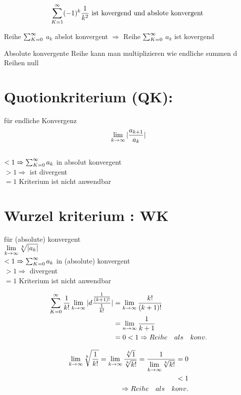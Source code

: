 \begin{example}
\[ \sum_{K=1}^{\infty} (-1)^k \frac{1}{k^2}  \text{ ist kovergend und abslote konvergent } \]
\end{example}

\begin{theorem}
Reihe $\sum_{K=0}^{\infty}$ $a_k$ abslot konvergent $\Rightarrow$ Reihe $\sum_{K=0}^{\infty}$ $a_k$ ist kovergend	
\end{theorem}

\begin{remark}	
Absolute konvergente Reihe kann man multiplizieren wie endliche summen d Reihen null
\end{remark}

\section{Quotionkriterium (QK):}
für endliche Konvergenz\\
\[\lim\limits_{k \rightarrow \infty} |\frac{a_{k+1}}{a_k}|\] \\$< 1 \Rightarrow \sum_{K=0}^{\infty} a_k $ in absolut konvergent \\
$>1 \Rightarrow $ ist divergent\\
$=1 $ Kriterium ist nicht anwendbar 
\section{Wurzel kriterium : WK }
für (absolute) konvergent 
\\ $\lim\limits_{k \rightarrow \infty} \sqrt[k]{|a_k|}$\\
$<1 \Rightarrow \sum_{K=0}^{\infty} a_k$ in (absolute) konvergent\\
$>1 \Rightarrow$ divergent\\
$=1 $ Kriterium ist nicht anwendbar

\begin{example}[QK]
	 \begin{equation*}
		 \begin{split}
	    	\sum_{K=0}^{\infty} \dfrac{1}{k!}
	 	   \lim\limits_{k \rightarrow \infty} {|d\frac{\frac{1}{(k+1)!}}{\frac{1}{k!}}|} &= \lim\limits_{k \rightarrow \infty} \frac{k!}{(k+1)!} \\
													   	   &=\lim\limits_{n \rightarrow \infty} \frac{1}{k+1}   \\
													   	   &=0<1 \Rightarrow  Reihe \quad als \quad konv. 
		    \end{split}	 
		 \end{equation*}     
	
\end{example}
\begin{example}[WK]
	\begin{equation*}
	\begin{split}
	\lim\limits_{k \rightarrow \infty} \sqrt[k]{\frac{1}{k!}}= \lim\limits_{k \rightarrow \infty} \frac{\sqrt[k]{1}}{\sqrt[k]{k!}}=\frac{1}{\lim\limits_{k \rightarrow \infty} \sqrt[k]{k!}}=0\\ <1 \\
	\Rightarrow Reihe \quad als \quad konv.
	\end{split}	 
	\end{equation*}     
	
\end{example}